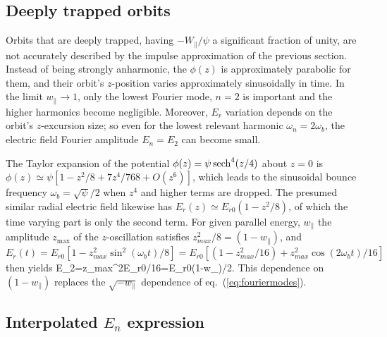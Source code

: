 \documentclass{agujournal2019}
\let\oldequation\equation
\let\oldendequation\endequation
\renewenvironment{equation}
  {\linenomathNonumbers\oldequation}
  {\oldendequation\endlinenomath}
\def\wp{w_\parallel}
\begin{document}
\subsection{Deeply trapped orbits}

Orbits that are deeply trapped, having $-W_\parallel/\psi$ a
significant fraction of unity, are not accurately described by the
impulse approximation of the previous section. Instead of being
strongly anharmonic, the $\phi(z)$ is approximately parabolic for
them, and their orbit's $z$-position varies approximately sinusoidally
in time. In the limit $\wp\to 1$, only the lowest Fourier
mode, $n=2$ is important and the higher harmonics become
negligible. Moreover, $E_r$ variation depends on the orbit's $z$-excursion
size; so even for the lowest relevant harmonic $\omega_n=2\omega_b$,
the electric field Fourier amplitude $E_n=E_2$ can become small.

The Taylor expansion of the potential
$\phi(z)=\psi\,{\rm sech}^4(z/4)$ about $z=0$ is
$\phi(z)\simeq \psi[1-z^2/8+7z^4/768+O(z^6)]$, which leads to the
sinusoidal bounce frequency $\omega_b=\sqrt{\psi}/2$ when $z^4$ and
higher terms are dropped. The presumed similar radial electric
field likewise has $E_r(z)\simeq E_{r0}(1-z^2/8)$, of which the time varying
part is only the second term. For given parallel energy,
$\wp$ the amplitude $z_{\max}$ of the $z$-oscillation satisfies
$z_{max}^2/8=(1-\wp)$, and
$
E_r(t)=E_{r0}[1-z_{max}^2\sin^2(\omega_bt)/8]=E_{r0}[(1-z_{max}^2/16)+z_{max}^2\cos(2\omega_bt)/16]$
then yields
\begin{equation}
  \label{eq:E2}
  E_2=z_{max}^2E_{r0}/16=E_{r0}(1-\wp)/2.
\end{equation}
This dependence on $(1-\wp)$ replaces the
$\sqrt{-\wp}$ dependence of eq.\
(\ref{eq:fouriermodes}). 

\subsection{Interpolated $E_n$ expression}
\end{document}
